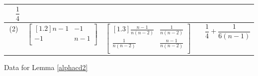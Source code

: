\documentclass[12pt]{amsart}
\numberwithin{equation}{section}
\theoremstyle{definition}
\begin{document}
\begin{figure}[t]
\begin{tabular}{ | c | c | c | c |}
\ \ $\dfrac{1}{4}$ 
\rule{0pt}{1.8\normalbaselineskip} \\[1.1\normalbaselineskip]
\hline

(2) 
& $\begin{bmatrix}[1.2]
	n-1 & -1 \\
 -1  & n-1  \\
\end{bmatrix}$ &

$\begin{bmatrix}[1.3]
 \frac{n-1}{n(n-2)} & \frac{1}{n(n-2)} \\[1mm]
 \frac{1}{n(n-2)}  & \frac{n-1}{n(n-2)}  \\[1mm]
\end{bmatrix}$
&

\ \ $\dfrac{1}{4}+\dfrac{1}{6(n-1)}$
\rule{0pt}{2\normalbaselineskip} \\[1.3\normalbaselineskip]
\hline

\end{tabular}

\caption{Data for Lemma \ref{alphacd2}}
\label{fig:data2}
\end{figure}
\end{document}
